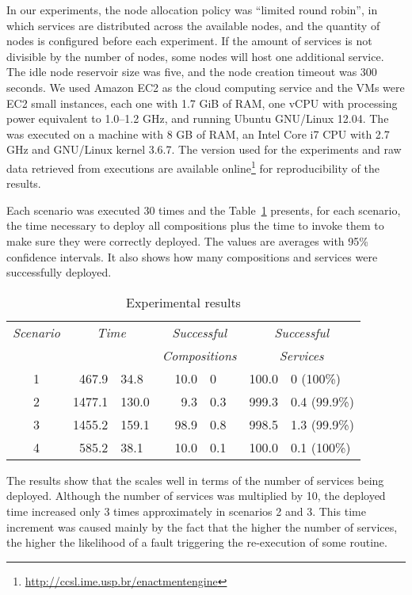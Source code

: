 In our experiments, 
the node allocation policy was ``limited round robin'',
in which services are distributed across the available nodes,
and the quantity of nodes is configured before each experiment.
If the amount of services is not divisible by the number of nodes,
some nodes will host one additional service.
The idle node reservoir size was five,
and the node creation timeout was 300 seconds.
We used Amazon EC2
as the cloud computing service and the VMs were EC2 small instances,
each one with 1.7 GiB of RAM, one vCPU
with processing power equivalent to 1.0--1.2 GHz,
and running Ubuntu GNU/Linux 12.04.
The \ee was executed on a machine with 8 GB of
RAM, an Intel Core i7 CPU with 2.7 GHz and GNU/Linux kernel 3.6.7.
The \ee version used for the experiments
and raw data retrieved from executions
are available online\footnote{\url{http://ccsl.ime.usp.br/enactmentengine}} for reproducibility of the results.

Each scenario was executed 30 times
and the Table~\ref{tab:results} presents, for each scenario,
the time necessary to deploy all compositions
plus the time to invoke them to make sure they were correctly deployed.
The values are averages with 95\% confidence intervals.
It also shows how many compositions and services were successfully deployed.

\begin{table}
\centering
\caption{Experimental results}
\label{tab:results}
\begin{tabular}{c r@{ $\pm$ }l r@{ $\pm$ }l r@{ $\pm$ }l} \hline

\emph{Scenario} & \multicolumn{2}{c}{\emph{Time}} & \multicolumn{2}{c}{\emph{Successful}}   & \multicolumn{2}{c}{\emph{Successful}}\\
                 & \multicolumn{2}{c}{}           & \multicolumn{2}{c}{\emph{Compositions}} & \multicolumn{2}{c}{\emph{Services}}\\
\hline
1 &  467.9 &  34.8 & 10.0 & 0   & 100.0 & 0   (100\%) \\
2 & 1477.1 & 130.0 &  9.3 & 0.3 & 999.3 & 0.4 (99.9\%)\\
3 & 1455.2 & 159.1 & 98.9 & 0.8 & 998.5 & 1.3 (99.9\%)\\
4 &  585.2 &  38.1 & 10.0 & 0.1 & 100.0 & 0.1 (100\%)\\
\hline \end{tabular}
\end{table}

The results show that the \ee scales well in terms of the number of
services being deployed. Although the number of services was
multiplied by 10, the deployed time increased only 3 times approximately
in scenarios 2 and 3.
This time increment was caused mainly by the fact that
the higher the number of services, the higher the likelihood
of a fault triggering the re-execution of some routine.

